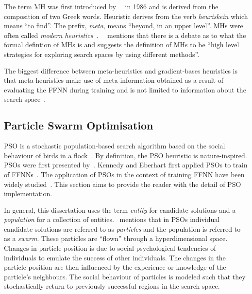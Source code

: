 The term \acf{MH} was first introduced by~\citeauthor{ref:glover:1986}~\cite{ref:glover:1986} in 1986 and is derived from the composition of two Greek words. Heuristic derives from the verb \textit{heuriskein} which means ``to find''. The prefix, \textit{meta}, means ``beyond, in an upper level''. \Acp{MH} were often called \textit{modern heuristics}~\cite{ref:reeves:1993}.~\citeauthor{ref:blum:2003}~\cite{ref:blum:2003} mentions that there is a debate as to what the formal defintion of \acp{MH} is and suggests the definition of \acp{MH} to be ``high level strategies for exploring search spaces by using different methods''.

The biggest difference between meta-heuristics and gradient-bases heuristics is that
meta-heuristics make use of meta-information obtained as a result of evaluating the \acs{FFNN} during training and is not limited to information about the search-space~\cite{ref:blum:2003}.


\subsection{Particle Swarm Optimisation}
\label{sec:heuristics:mh:pso}

\Ac{PSO} is a stochastic population-based search algorithm based on the social behaviour of birds in a flock~\cite{ref:kennedy:1995}. By definition, the \acs{PSO} heuristic is nature-inspired.  \Acp{PSO} were first presented  by~\citeauthor{ref:kennedy:1995}\cite{ref:kennedy:1995}. Kennedy and Eberhart first applied \acp{PSO} to train of \acp{FFNN}~\cite{ref:eberhart:1995, ref:kennedy:1997}. The application of \acp{PSO} in the context of training \acs{FFNN} have been widely studied~\cite{ref:rakitianskaia:2012, ref:vanwyk:2014}. This section aims to provide the reader with the detail of \acs{PSO} implementation.

In general, this dissertation uses the term \textit{entity} for candidate solutions and a \textit{population} for a collection of entities.~\citeauthor{ref:engelbrecht:2007}\cite{ref:engelbrecht:2007} mentions that in \acp{PSO} individual candidate solutions are referred to as \textit{particles} and the population is referred to as a \textit{swarm}. These particles are ``flown'' through a hyperdimensional space. Changes in particle position is due to social-psychological tendencies of individuals to emulate the success of other individuals. The changes in the particle position are then influenced by the experience or knowledge of the particle's neighbours. The social behaviour of particles is modeled such that they stochastically return to previously successful regions in the search space.

